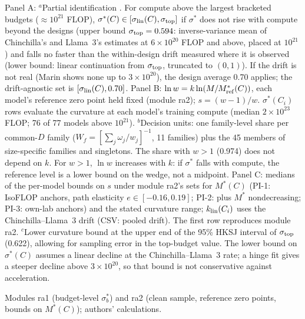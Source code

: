 \begin{table}[tp]
\begin{tablenotes}
Panel A: $^{a}$Partial identification \citep{manski2003partial}. For compute above the largest bracketed budgets ($\approx10^{21}$ FLOP), $\sigma^*(C)\in[\sigma_{\rm lin}(C),\sigma_{\rm top}]$ if $\sigma^*$ does not rise with compute beyond the designs (upper bound $\sigma_{\rm top}=0.594$: inverse-variance mean of Chinchilla's and Llama~3's estimates at $6\times10^{20}$ FLOP and above, placed at $10^{21}$) and falls no faster than the within-design drift measured where it is observed (lower bound: linear continuation from $\sigma_{\rm top}$, truncated to $(0,1)$). If the drift is not real (Marin shows none up to $3\times10^{20}$), the design average 0.70 applies; the drift-agnostic set is $[\sigma_{\rm lin}(C),0.70]$. Panel B: $\ln w=k\ln(M/M^*_{\rm ref}(C))$, each model's reference zero point held fixed (module ra2); $s=(w-1)/w$. $\sigma^*(C_i)$ rows evaluate the curvature at each model's training compute (median $2\times10^{23}$ FLOP; 76 of 77 models above $10^{21}$). $^{b}$Decision units: one family-level share per common-$D$ family ($W_f=[\sum_j\omega_j/w_j]^{-1}$, 11 families) plus the 45 members of size-specific families and singletons. The share with $w>1$ (0.974) does not depend on $k$. For $w>1$, $\ln w$ increases with $k$: if $\sigma^*$ falls with compute, the reference level is a lower bound on the wedge, not a midpoint. Panel C: medians of the per-model bounds on $s$ under module ra2's sets for $M^*(C)$ (PI-1: IsoFLOP anchors, path elasticity $e\in[-0.16,0.19]$; PI-2: plus $M^*$ nondecreasing; PI-3: own-lab anchors) and the stated curvature range; $k_{\rm lin}(C_i)$ uses the Chinchilla--Llama~3 drift (CSV: pooled drift). The first row reproduces module ra2. $^{c}$Lower curvature bound at the upper end of the 95\% HKSJ interval of $\sigma_{\rm top}$ (0.622), allowing for sampling error in the top-budget value. The lower bound on $\sigma^*(C)$ assumes a linear decline at the Chinchilla--Llama~3 rate; a hinge fit gives a steeper decline above $3\times10^{20}$, so that bound is not conservative against acceleration.
\end{tablenotes}

\begin{tablenotes}[Source]
Modules ra1 (budget-level $\sigma^*_b$) and ra2 (clean sample, reference zero points, bounds on $M^*(C)$); authors' calculations.
\end{tablenotes}
\end{table}
